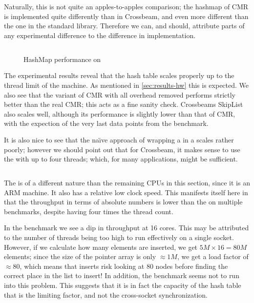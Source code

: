 Naturally, this is not quite an apples-to-apples comparison; the hashmap of CMR is implemented
quite differently than in Crossbeam, and even more different than the one in the standard library.
Therefore we can, and should, attribute parts of any experimental difference to the difference in
implementation.


\clearpage
\subsection{\gribb}

\begin{figure}[ht]
  \centering
  \caption{HashMap performance on \gribb}
\end{figure}

The experimental results reveal that the hash table scales properly up to the thread limit of the
machine. As mentioned in \cref{sec:results-hw} this is expected. We also see that the variant of
CMR with all overhead removed performs strictly better than the real CMR\@; this acts as a fine
sanity check. Crossbeams SkipList also scales well, although its performance is slightly lower than
that of CMR, with the expection of the very last data points from the  benchmark.

It is also nice to see that the na\"\i{}ve approach of wrapping a  in a 
scales rather poorly; however we should point out that for Crossbeam, it makes sense to use the
 with up to four threads; which, for many applications, might be sufficient.

\clearpage
\subsection{\scaleway}

The \scaleway is of a different nature than the remaining CPUs in this section, since it is an ARM
machine. It also has a relative low clock speed. This manifests itself here in that the throughput
in terms of absolute numbers is lower than the \gribb{} on multiple benchmarks, despite having four
times the thread count.

In the  benchmark we see a dip in throughput at 16 cores. This may be attributed to
the number of threads being too high to run effectively on a single socket. However, if we
calculate how many elements are inserted, we get $5M \times 16 = 80M$ elements; since the size of
the pointer array is only $\approx 1M$,  we get a load factor of $\approx 80$, which means that
inserts risk looking at 80 nodes before finding the correct place in the list to insert!
In addition, the  benchmark seems not to run into this problem. This suggests that it
is in fact the capacity of the hash table that is the limiting factor, and not the cross-socket
synchronization.

